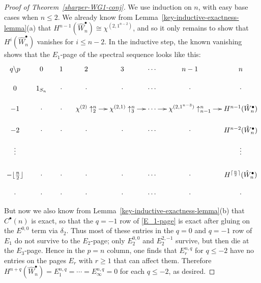 \documentclass[12pt]{amsart}
\theoremstyle{plain}
\theoremstyle{definition}
\begin{document}
\begin{proof}[Proof of Theorem~\ref{sharper-WG1-conj}]
We use induction on $n$, with easy base cases when $n \leq 2$. 
We already know from 
Lemma~\ref{key-inductive-exactness-lemma}(a) that
$H^{n-1}(\hat{W}^\bullet_n) \cong \chi^{(2,1^{n-2})}$, and so it
only remains to show that $H^i(\hat{W}^\bullet_n)$ vanishes
for $i \leq n-2$.  In the inductive step, the known vanishing shows
that the $E_1$-page of the spectral sequence looks like this:
\begin{equation}
\label{E_1-page}
\xymatrix@R=1pc@C=1pc{
q\backslash p &0            &1          &2          &3  &\cdots          &n-1          &n \\
0   &1_{S_n}           &\cdot          &\cdot          &\cdot           &\cdots          &\cdot          &\cdot\\
-1  &\cdot            &\cdot           &\chi^{(2)}\uparrow_{2}^{n} \ar[r]    & \chi^{(2,1)}\uparrow_{3}^{n} \ar[r]    & \cdots \ar[r]    & \chi^{(2,1^{n-3})} \uparrow_{n-1}^{n}\ar[r]  & H^{n-1}(\hat{W}_n^\bullet)  \\
-2  &\cdot                      &\cdot           &\cdot           &\cdot           & \cdots  &\cdot  &H^{n-2}(\hat{W}_n^\bullet) \\
\vdots   &     &     &     &     &     &     & \vdots \\
-\lfloor \frac{n}{2} \rfloor  &\cdot                      &\cdot           &\cdot           &\cdot           &\cdots           &\cdot       & H^{\lceil \frac{n}{2}\rceil}(\hat{W}_n^\bullet)\\
\cdot   &  \cdot   &  \cdot   & \cdot    & \cdot    &  \cdots   & \cdot    &\cdot \\
}
\end{equation}

\noindent
But now we also know from Lemma~\ref{key-inductive-exactness-lemma}(b) that $C^\bullet(n)$ is exact, so that 
the $q=-1$ row  of \eqref{E_1-page} is exact after gluing on the $E^{0,0}$ term via $\delta_2$.
Thus most of these entries in the $q=0$ and $q=-1$ row of $E_1$ 
do not survive to the  $E_2$-page;  only $E_2^{0,0}$ and $E_2^{2,-1}$ survive,
but then die at the $E_3$-page.
Hence in the $p=n$ column, one finds that $E_r^{n,q}$ for $q \le -2$ 
have no entries on the pages $E_r$ with $r \geq 1$ that can affect them.
Therefore $H^{n+q}(\hat{W}_n^\bullet)=E_1^{n,q}= \cdots = E_\infty^{n,q}=0$ for each $q \le -2$, as desired.
\end{proof}
\end{document}
